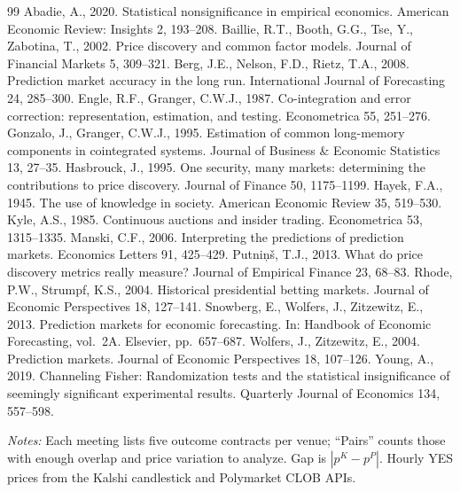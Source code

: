 \documentclass[12pt]{article}
\begin{document}
\begin{thebibliography}{99}
 Abadie, A., 2020. Statistical nonsignificance in empirical
economics. American Economic Review: Insights 2, 193--208.
 Baillie, R.T., Booth, G.G., Tse, Y., Zabotina, T.,
2002. Price discovery and common factor models. Journal of Financial Markets 5, 309--321.
 Berg, J.E., Nelson, F.D., Rietz, T.A., 2008.
Prediction market accuracy in the long run. International Journal of Forecasting 24, 285--300.
 Engle, R.F., Granger, C.W.J., 1987.
Co-integration and error correction: representation, estimation, and testing.
Econometrica 55, 251--276.
 Gonzalo, J., Granger, C.W.J., 1995.
Estimation of common long-memory components in cointegrated systems.
Journal of Business \& Economic Statistics 13, 27--35.
 Hasbrouck, J., 1995. One security, many markets:
determining the contributions to price discovery. Journal of Finance 50, 1175--1199.
 Hayek, F.A., 1945. The use of knowledge in society.
American Economic Review 35, 519--530.
 Kyle, A.S., 1985. Continuous auctions and insider trading.
Econometrica 53, 1315--1335.
 Manski, C.F., 2006. Interpreting the predictions of
prediction markets. Economics Letters 91, 425--429.
 Putni\c{n}\v{s}, T.J., 2013. What do price
discovery metrics really measure? Journal of Empirical Finance 23, 68--83.
 Rhode, P.W., Strumpf, K.S., 2004. Historical
presidential betting markets. Journal of Economic Perspectives 18, 127--141.
 Snowberg, E., Wolfers, J., Zitzewitz, E., 2013.
Prediction markets for economic forecasting. In: Handbook of Economic Forecasting, vol.\ 2A.
Elsevier, pp.\ 657--687.
 Wolfers, J., Zitzewitz, E., 2004.
Prediction markets. Journal of Economic Perspectives 18, 107--126.
 Young, A., 2019. Channeling Fisher: Randomization tests and
the statistical insignificance of seemingly significant experimental results. Quarterly Journal
of Economics 134, 557--598.
\end{thebibliography}

\FloatBarrier
\newpage
\begin{table}[htbp]\centering
\begin{threeparttable}
\caption{Matched FOMC contracts across venues}\label{tab:sample}\small

\begin{tablenotes}\small\item \textit{Notes:} Each meeting lists five outcome contracts per
venue; ``Pairs'' counts those with enough overlap and price variation to analyze. Gap is
$|p^K-p^P|$. Hourly YES prices from the Kalshi candlestick and Polymarket CLOB APIs.
\end{tablenotes}
\end{threeparttable}
\end{table}
\end{document}
